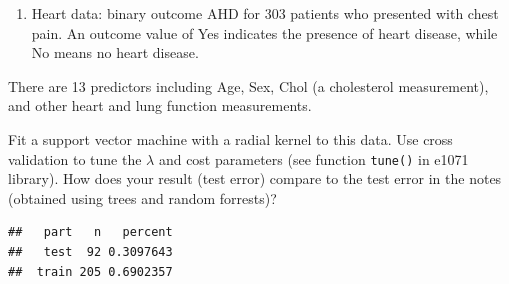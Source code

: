\documentclass[]{article}
\newenvironment{Shaded}{\begin{snugshade}}{\end{snugshade}}
\newcommand{\DataTypeTok}[1]{\textcolor[rgb]{0.13,0.29,0.53}{#1}}
\newcommand{\DecValTok}[1]{\textcolor[rgb]{0.00,0.00,0.81}{#1}}
\newcommand{\FloatTok}[1]{\textcolor[rgb]{0.00,0.00,0.81}{#1}}
\newcommand{\KeywordTok}[1]{\textcolor[rgb]{0.13,0.29,0.53}{\textbf{#1}}}
\newcommand{\NormalTok}[1]{#1}
\newcommand{\OperatorTok}[1]{\textcolor[rgb]{0.81,0.36,0.00}{\textbf{#1}}}
\newcommand{\StringTok}[1]{\textcolor[rgb]{0.31,0.60,0.02}{#1}}
\providecommand{\tightlist}{%
  \setlength{\itemsep}{0pt}\setlength{\parskip}{0pt}}
\begin{document}
\begin{enumerate}
\def\labelenumi{\arabic{enumi}.}
\setcounter{enumi}{6}
\tightlist
\item
  Heart data: binary outcome AHD for 303 patients who presented with
  chest pain. An outcome value of Yes indicates the presence of heart
  disease, while No means no heart disease.
\end{enumerate}

There are 13 predictors including Age, Sex, Chol (a cholesterol
measurement), and other heart and lung function measurements.

Fit a support vector machine with a radial kernel to this data. Use
cross validation to tune the \(\lambda\) and cost parameters (see
function \texttt{tune()} in e1071 library). How does your result (test
error) compare to the test error in the notes (obtained using trees and
random forrests)?

\begin{Shaded}
\end{Shaded}

\begin{verbatim}
##   part   n   percent
##   test  92 0.3097643
##  train 205 0.6902357
\end{verbatim}
\end{document}
